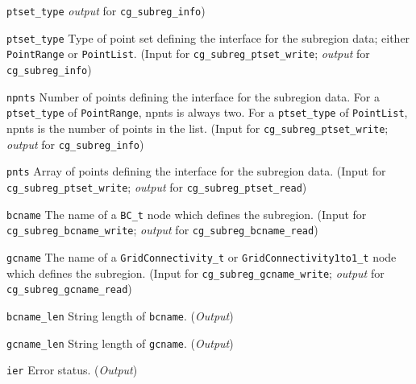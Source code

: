 \begin{Ventryi}{\texttt{ptset\_type}}
      \textcolor{output}{\textit{output}} for \texttt{cg\_subreg\_info})
\item [\texttt{ptset\_type}]
      Type of point set defining the interface for the subregion data;
      either \texttt{PointRange} or \texttt{PointList}.
      (\textcolor{input}{Input} for \texttt{cg\_subreg\_ptset\_write};
      \textcolor{output}{\textit{output}} for
      \texttt{cg\_subreg\_info})
\item [\texttt{npnts}]
      Number of points defining the interface for the subregion data.
      For a \texttt{ptset\_type} of \texttt{PointRange}, npnts
      is always two. For a \texttt{ptset\_type} of \texttt{PointList},
      npnts is the number of points in the list. 
      (\textcolor{input}{Input} for \texttt{cg\_subreg\_ptset\_write};
      \textcolor{output}{\textit{output}} for
      \texttt{cg\_subreg\_info})
\item [\texttt{pnts}]
      Array of points defining the interface for the subregion data.
      (\textcolor{input}{Input} for \texttt{cg\_subreg\_ptset\_write};
      \textcolor{output}{\textit{output}} for
      \texttt{cg\_subreg\_ptset\_read})
\item [\texttt{bcname}]
      The name of a \texttt{BC\_t} node which defines the subregion.
      (\textcolor{input}{Input} for \texttt{cg\_subreg\_bcname\_write};
      \textcolor{output}{\textit{output}} for
      \texttt{cg\_subreg\_bcname\_read})
\item [\texttt{gcname}]
      The name of a \texttt{GridConnectivity\_t} or
      \texttt{GridConnectivity1to1\_t} node which defines the subregion.
      (\textcolor{input}{Input} for \texttt{cg\_subreg\_gcname\_write};
      \textcolor{output}{\textit{output}} for
      \texttt{cg\_subreg\_gcname\_read})
\item [\texttt{bcname\_len}]
      String length of \texttt{bcname}.
      (\textcolor{output}{\textit{Output}})
\item [\texttt{gcname\_len}]
      String length of \texttt{gcname}.
      (\textcolor{output}{\textit{Output}})
\item [\texttt{ier}]
      Error status.
      (\textcolor{output}{\textit{Output}})
\end{Ventryi}

